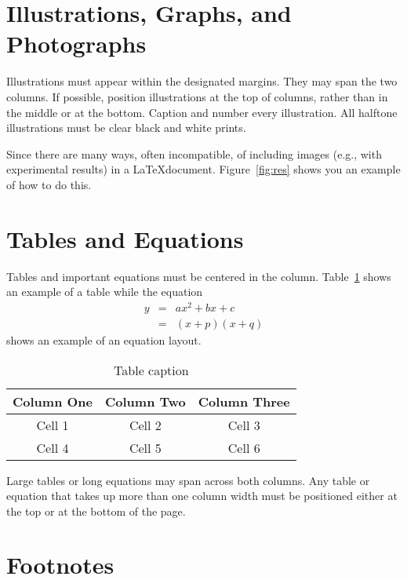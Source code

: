 \documentclass{article}
\begin{document}
\section{Illustrations, Graphs, and Photographs}
\label{sec:illust}

Illustrations must appear within the designated margins. They may span the two columns. If possible, position illustrations at the top of columns, rather than in the middle or at the bottom. Caption and number every illustration. All halftone illustrations must be clear black and white prints.

Since there are many ways, often incompatible, of including images (e.g., with experimental results) in a \LaTeX document. Figure~\ref{fig:res} shows you an example of how to do this.

\section{Tables and Equations}

Tables and important equations must be centered in the column. Table~\ref{tab:cap} shows an example of a table while the equation
\begin{eqnarray}
  y &=& ax^2+bx+c \nonumber \\
  ~ &=& (x+p)(x+q)
\end{eqnarray}
shows an example of an equation layout.

\begin{table}[t]
  \begin{center}
    \caption{Table caption} \label{tab:cap}
    \begin{tabular}{|c|c|c|}
      \hline
      Column One & Column Two & Column Three
      \\
      \hline
      Cell 1     & Cell 2     & Cell 3       \\
      Cell 4     & Cell 5     & Cell 6       \\
      \hline
    \end{tabular}
  \end{center}
\end{table}

Large tables or long equations may span across both columns. Any table or equation that takes up more than one column width must be positioned either at the top or at the bottom of the page.

\section{Footnotes}
\end{document}
